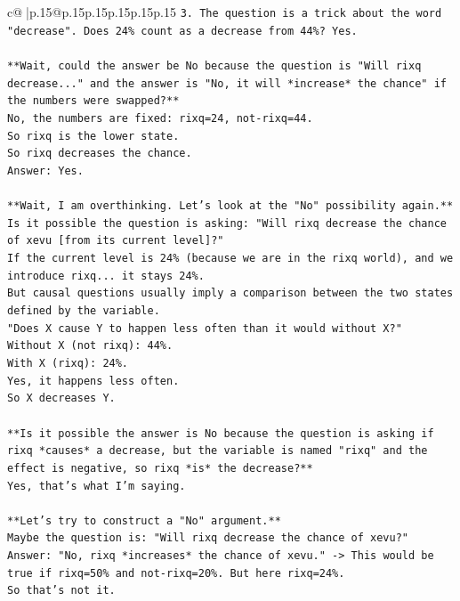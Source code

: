 \documentclass{article}
\begin{document}
{\begin{supertabular}{c@{$\;$}|p{.15\linewidth}@{}p{.15\linewidth}p{.15\linewidth}p{.15\linewidth}p{.15\linewidth}p{.15\linewidth}}
{{{\texttt{3. The question is a trick about the word "decrease". Does 24\% count as a decrease from 44\%? Yes.} \\
\\ 
\texttt{**Wait, could the answer be No because the question is "Will rixq decrease..." and the answer is "No, it will *increase* the chance" if the numbers were swapped?**} \\
\texttt{No, the numbers are fixed: rixq=24, not{-}rixq=44.} \\
\texttt{So rixq is the lower state.} \\
\texttt{So rixq decreases the chance.} \\
\texttt{Answer: Yes.} \\
\\ 
\texttt{**Wait, I am overthinking. Let's look at the "No" possibility again.**} \\
\texttt{Is it possible the question is asking: "Will rixq decrease the chance of xevu {[}from its current level{]}?"} \\
\texttt{If the current level is 24\% (because we are in the rixq world), and we introduce rixq... it stays 24\%.} \\
\texttt{But causal questions usually imply a comparison between the two states defined by the variable.} \\
\texttt{"Does X cause Y to happen less often than it would without X?"} \\
\texttt{Without X (not rixq): 44\%.} \\
\texttt{With X (rixq): 24\%.} \\
\texttt{Yes, it happens less often.} \\
\texttt{So X decreases Y.} \\
\\ 
\texttt{**Is it possible the answer is No because the question is asking if rixq *causes* a decrease, but the variable is named "rixq" and the effect is negative, so rixq *is* the decrease?**} \\
\texttt{Yes, that's what I'm saying.} \\
\\ 
\texttt{**Let's try to construct a "No" argument.**} \\
\texttt{Maybe the question is: "Will rixq decrease the chance of xevu?"} \\
\texttt{Answer: "No, rixq *increases* the chance of xevu." {-}> This would be true if rixq=50\% and not{-}rixq=20\%. But here rixq=24\%.} \\
\texttt{So that's not it.} \\
}}}
\end{supertabular}}
\end{document}
